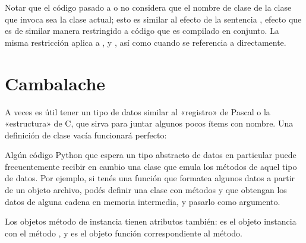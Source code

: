 \documentclass[a5paper,10pt,spanish]{sphinxmanual}
\begin{document}
\sphinxAtStartPar
Notar que el código pasado a  o  no considera que el nombre de clase de la clase que invoca sea la clase actual; esto es similar al efecto de la sentencia , efecto que es de similar manera restringido a código que es compilado en conjunto.  La misma restricción aplica a ,  y , así como cuando se referencia a  directamente.


\section{Cambalache}
\label{\detokenize{tutorial/classes:odds-and-ends}}\label{\detokenize{tutorial/classes:tut-odds}}
\sphinxAtStartPar
A veces es útil tener un tipo de datos similar al «registro» de Pascal o la «estructura» de C, que sirva para juntar algunos pocos ítems con nombre.  Una definición de clase vacía funcionará perfecto:

\begin{sphinxVerbatim}[commandchars=\\\{\}]
 

    

  
  
  
\end{sphinxVerbatim}

\sphinxAtStartPar
Algún código Python que espera un tipo abstracto de datos en particular puede frecuentemente recibir en cambio una clase que emula los métodos de aquel tipo de datos.  Por ejemplo, si tenés una función que formatea algunos datos a partir de un objeto archivo, podés definir una clase con métodos  y  que obtengan los datos de alguna cadena en memoria intermedia, y pasarlo como argumento.

\sphinxAtStartPar
Los objetos método de instancia tienen atributos también:  es el objeto instancia con el método , y  es el objeto función correspondiente al método.
\end{document}
